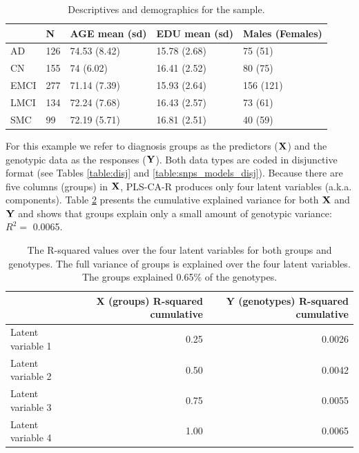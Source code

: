\documentclass[12pt]{article}
\begin{document}
\begin{table}[!h]

\caption{\label{tab:sample_descriptives}\label{table:desctab} Descriptives and demographics for the sample.}
\centering
\begin{tabular}[t]{lllll}
\toprule
  & N & AGE mean (sd) & EDU mean (sd) & Males (Females)\\
\midrule
AD & 126 & 74.53 (8.42) & 15.78 (2.68) & 75 (51)\\
CN & 155 & 74 (6.02) & 16.41 (2.52) & 80 (75)\\
EMCI & 277 & 71.14 (7.39) & 15.93 (2.64) & 156 (121)\\
LMCI & 134 & 72.24 (7.68) & 16.43 (2.57) & 73 (61)\\
SMC & 99 & 72.19 (5.71) & 16.81 (2.51) & 40 (59)\\
\bottomrule
\end{tabular}
\end{table}

For this example we refer to diagnosis groups as the predictors
(\({\bf X}\)) and the genotypic data as the responses (\({\bf Y}\)).
Both data types are coded in disjunctive format (see Tables
\ref{table:disj} and \ref{table:snps_models_disj}). Because there are
five columns (groups) in \({\bf X}\), PLS-CA-R produces only four latent
variables (a.k.a. components). Table \ref{table:r2ex1} presents the
cumulative explained variance for both \({\bf X}\) and \({\bf Y}\) and
shows that groups explain only a small amount of genotypic variance:
\(R^2=\) 0.0065.

\begin{table}[!h]

\caption{\label{tab:unnamed-chunk-3}\label{table:r2ex1} The R-squared values over the four latent variables for both groups and genotypes. The full variance of groups is explained over the four latent variables. The groups explained 0.65\% of the genotypes.}
\centering
\begin{tabular}[t]{lrr}
\toprule
  & X (groups) R-squared cumulative & Y (genotypes) R-squared cumulative\\
\midrule
Latent variable 1 & 0.25 & 0.0026\\
Latent variable 2 & 0.50 & 0.0042\\
Latent variable 3 & 0.75 & 0.0055\\
Latent variable 4 & 1.00 & 0.0065\\
\bottomrule
\end{tabular}
\end{table}
\end{document}
